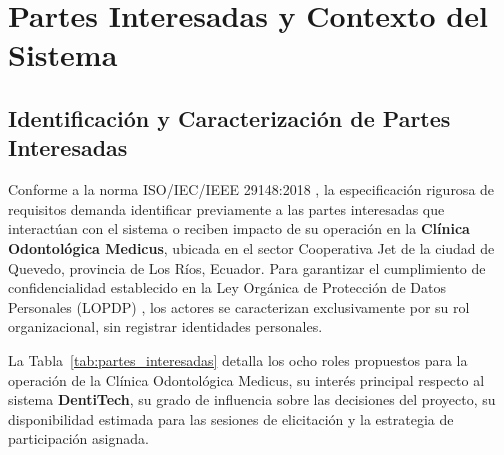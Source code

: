 

\section{Partes Interesadas y Contexto del Sistema}

\subsection{Identificación y Caracterización de Partes Interesadas}

Conforme a la norma ISO/IEC/IEEE 29148:2018 \cite{iso29148}, la especificación rigurosa de requisitos demanda identificar previamente a las partes interesadas que interactúan con el sistema o reciben impacto de su operación en la \textbf{Clínica Odontológica Medicus}, ubicada en el sector Cooperativa Jet de la ciudad de Quevedo, provincia de Los Ríos, Ecuador. Para garantizar el cumplimiento de confidencialidad establecido en la Ley Orgánica de Protección de Datos Personales (LOPDP) \cite{lopdp2021}, los actores se caracterizan exclusivamente por su rol organizacional, sin registrar identidades personales.

La Tabla~\ref{tab:partes_interesadas} detalla los ocho roles propuestos para la operación de la Clínica Odontológica Medicus, su interés principal respecto al sistema \textbf{DentiTech}, su grado de influencia sobre las decisiones del proyecto, su disponibilidad estimada para las sesiones de elicitación y la estrategia de participación asignada.

